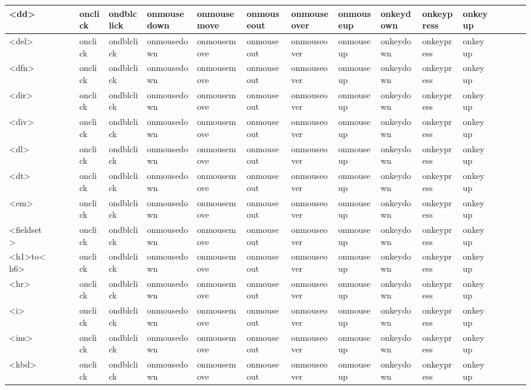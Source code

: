 \begin{center}
\begin{landscape}
\begin{longtable}{|l|l|l|l|l|l|l|l|l|l|l|l|l|l|l|l|l|l|}
\hline
<dd>		&	&	&	& onclick	& ondblclick & onmousedown & onmousemove & onmouseout & onmouseover & onmouseup & onkeydown & onkeypress & onkeyup & & & & \\
\hline
<del>		&	&	&	& onclick	& ondblclick & onmousedown & onmousemove & onmouseout & onmouseover & onmouseup & onkeydown & onkeypress & onkeyup & & & & \\
\hline
<dfn>		&	&	&	& onclick	& ondblclick & onmousedown & onmousemove & onmouseout & onmouseover & onmouseup & onkeydown & onkeypress & onkeyup & & & & \\
\hline
<dir>		&	&	&	& onclick	& ondblclick & onmousedown & onmousemove & onmouseout & onmouseover & onmouseup & onkeydown & onkeypress & onkeyup & & & & \\
\hline
<div>		&	&	&	& onclick	& ondblclick & onmousedown & onmousemove & onmouseout & onmouseover & onmouseup & onkeydown & onkeypress & onkeyup & & & & \\
\hline
<dl>			&	&	&	& onclick	& ondblclick & onmousedown & onmousemove & onmouseout & onmouseover & onmouseup & onkeydown & onkeypress & onkeyup & & & & \\
\hline
<dt>			&	&	&	& onclick	& ondblclick & onmousedown & onmousemove & onmouseout & onmouseover & onmouseup & onkeydown & onkeypress & onkeyup & & & & \\
\hline
<em>		&	&	&	& onclick	& ondblclick & onmousedown & onmousemove & onmouseout & onmouseover & onmouseup & onkeydown & onkeypress & onkeyup & & & & \\
\hline
<fieldset>	&	&	&	& onclick	& ondblclick & onmousedown & onmousemove & onmouseout & onmouseover & onmouseup & onkeydown & onkeypress & onkeyup & & & & \\
\hline
<h1>to<h6>	&	&	&	& onclick	& ondblclick & onmousedown & onmousemove & onmouseout & onmouseover & onmouseup & onkeydown & onkeypress & onkeyup & & & & \\
\hline
<hr>			&	&	&	& onclick	& ondblclick & onmousedown & onmousemove & onmouseout & onmouseover & onmouseup & onkeydown & onkeypress & onkeyup & & & & \\
\hline
<i>			&	&	&	& onclick	& ondblclick & onmousedown & onmousemove & onmouseout & onmouseover & onmouseup & onkeydown & onkeypress & onkeyup & & & & \\
\hline
<ins>		&	&	&	& onclick	& ondblclick & onmousedown & onmousemove & onmouseout & onmouseover & onmouseup & onkeydown & onkeypress & onkeyup & & & & \\
\hline
<kbd>		&	&	&	& onclick	& ondblclick & onmousedown & onmousemove & onmouseout & onmouseover & onmouseup & onkeydown & onkeypress & onkeyup & & & & \\

\end{longtable}
\end{landscape}
\end{center}
